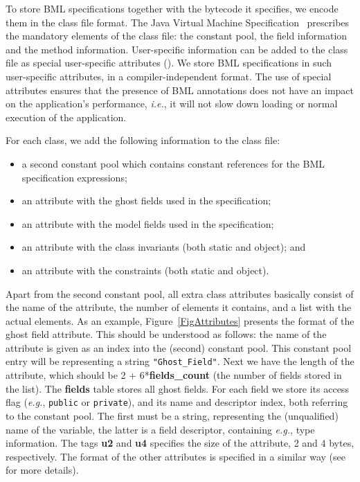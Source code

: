 To store BML specifications together with the bytecode it specifies,
we encode them in the class file format. The Java Virtual Machine
Specification~\cite{LindholmY99} prescribes the mandatory elements of the
class file: the constant pool, the field information and the method
information. User-specific information can be added to the class file
as special user-specific attributes (\cite[\S4.7.1]{LindholmY99}).  We
store BML specifications in such user-specific attributes, in a
compiler-independent format. The use of special attributes ensures
that the presence of BML annotations does not have an impact on the
application's performance, \emph{i.e.}, it will not slow down loading
or normal execution of the application.

For each class, we add the following information to the class file:
\begin{itemize}
\item a second constant pool which contains constant references
      for the BML specification expressions;
\item an attribute with the ghost fields used in the specification;
\item an attribute with the model fields used in the specification;
\item an attribute with the class invariants (both static and object); and
\item an attribute with the constraints (both static and object).
\end{itemize}
Apart from the second constant pool, all extra class attributes
basically consist of the name of the attribute, the number of elements
it contains, and a list with the actual elements.  As an example,
Figure~\ref{FigAttributes} presents the format of the ghost field
attribute. This should be understood as follows: the name of the
attribute is given as an index into the (second) constant pool. This
constant pool entry will be representing a string
\texttt{"Ghost\_Field"}. Next we have the length of the attribute,
which should be 2 + 6*\textbf{fields\_count} (the number of fields
stored in the list). The \textbf{fields} table stores all ghost
fields. For each field we store its access flag (\emph{e.g.},
\texttt{public} or
\texttt{private}), and its name and descriptor index, both
referring to the constant pool. The first must be a string,
representing the (unqualified) name of the variable, the latter is a
field descriptor, containing \emph{e.g.}, type information.  The tags
\textbf{u2} and \textbf{u4} specifies the size of the attribute, 2 and
4 bytes, respectively. The format of the other attributes is
specified in a similar way (see~\cite{Pavlova07} for more details).



